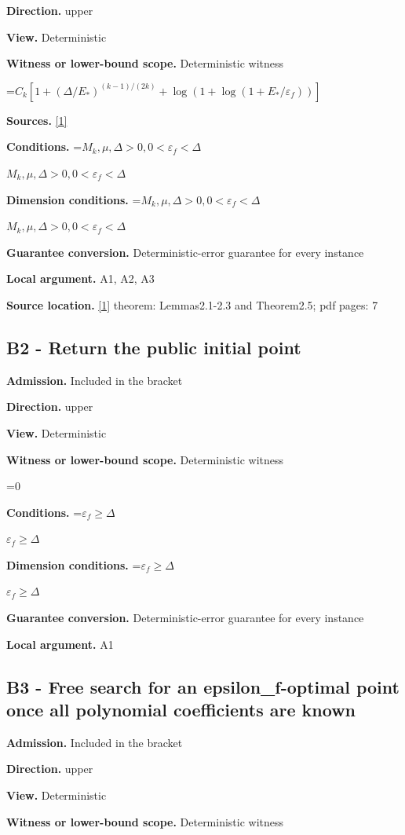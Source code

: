 \documentclass[10pt,a4paper]{article}
\newcommand{\AtlasMath}[1]{\par\begingroup\centering\setbox0=\hbox{$\displaystyle #1$}\ifdim\wd0>1.4\linewidth\typeout{ATLAS WIDE FORMULA: \the\wd0}\fi\ifdim\wd0>\linewidth\resizebox{\linewidth}{!}{\box0}\else\box0\fi\par\endgroup}
\newcommand{\AtlasInlineMath}[1]{\begingroup\setbox0=\hbox{$#1$}\ifdim\wd0>.4\linewidth\endgroup\AtlasMath{#1}\else\endgroup$#1$\fi}
\begin{document}
\textbf{Direction.} upper

\textbf{View.} Deterministic

\textbf{Witness or lower-bound scope.} Deterministic witness

\AtlasMath{C_k[1+(\Delta/E_*)^{(k-1)/(2k)}+\log(1+\log(1+E_*/\varepsilon_f))]}
\textbf{Sources.} \href{https://optimization-online.org/wp-content/uploads/2015/06/4970.pdf}{[1]}

\textbf{Conditions.} \AtlasInlineMath{M_k,\mu,\Delta>0,0<\varepsilon_f<\Delta}

\textbf{Dimension conditions.} \AtlasInlineMath{M_k,\mu,\Delta>0,0<\varepsilon_f<\Delta}

\textbf{Guarantee conversion.} Deterministic-error guarantee for every instance

\textbf{Local argument.} A1, A2, A3

\textbf{Source location.} \href{https://optimization-online.org/wp-content/uploads/2015/06/4970.pdf}{[1]} theorem: Lemmas2.1-2.3 and Theorem2.5; pdf pages: 7

\subsection{B2 - Return the public initial point}
\textbf{Admission.} Included in the bracket

\textbf{Direction.} upper

\textbf{View.} Deterministic

\textbf{Witness or lower-bound scope.} Deterministic witness

\AtlasMath{0}
\textbf{Conditions.} \AtlasInlineMath{\varepsilon_f\ge \Delta}

\textbf{Dimension conditions.} \AtlasInlineMath{\varepsilon_f\ge \Delta}

\textbf{Guarantee conversion.} Deterministic-error guarantee for every instance

\textbf{Local argument.} A1

\subsection{B3 - Free search for an epsilon\_f-optimal point once all polynomial coefficients are known}
\textbf{Admission.} Included in the bracket

\textbf{Direction.} upper

\textbf{View.} Deterministic

\textbf{Witness or lower-bound scope.} Deterministic witness
\end{document}
